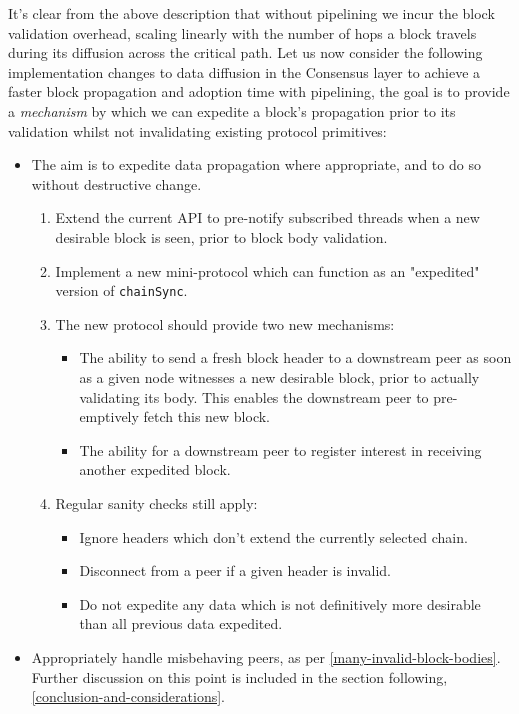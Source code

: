 \documentclass[11pt,a4paper]{article}
\begin{document}
It's clear from the above description that without pipelining we incur the block validation overhead,
scaling linearly with the number of hops a block travels during its diffusion across the critical path.
Let us now consider the following implementation changes to data diffusion in the Consensus layer to achieve
a faster block propagation and adoption time with pipelining, the goal is to provide a \emph{mechanism} by which we 
can expedite a block's propagation prior to its validation whilst not invalidating existing protocol primitives:

\begin{itemize}
  \item The aim is to expedite data propagation where appropriate, and to do so without destructive change.
  \begin{enumerate}
    \item Extend the current API to pre-notify subscribed threads when a new desirable block is seen, prior to block body validation.
    \item Implement a new mini-protocol which can function as an "expedited" version of \lstinline{chainSync}.
    \item The new protocol should provide two new mechanisms:
    \begin{itemize}
      \item The ability to send a fresh block header to a downstream peer as soon as a given node witnesses a new desirable block, prior to actually validating its body. This enables the downstream peer to pre-emptively fetch this new block.
      \item The ability for a downstream peer to register interest in receiving another expedited block. 
    \end{itemize}
    \item Regular sanity checks still apply:
    \begin{itemize}
      \item Ignore headers which don't extend the currently selected chain.
      \item Disconnect from a peer if a given header is invalid.
      \item Do not expedite any data which is not definitively more desirable than all previous data expedited. 
    \end{itemize} 
  \end{enumerate}
  \item Appropriately handle misbehaving peers, as per \cref{many-invalid-block-bodies}. Further discussion on this point is included in the section following, \cref{conclusion-and-considerations}.
\end{itemize}
  
\end{document}
